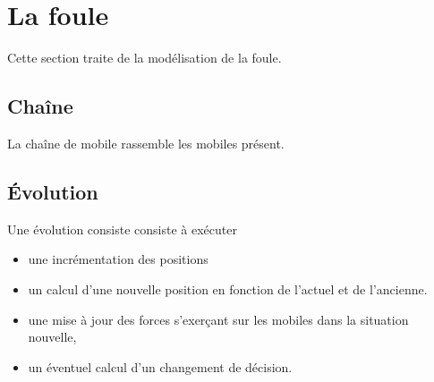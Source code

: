 %
\section{La foule}
%
Cette section traite de la modélisation de la foule.
%
\subsection{Chaîne}
La chaîne de mobile rassemble les mobiles présent.
%
\subsection{Évolution}
Une évolution consiste consiste à exécuter
\begin{itemize}[leftmargin=1cm, label=, itemsep=0pt]%
\item  une incrémentation des positions
\item  un calcul d'une nouvelle position en fonction de l'actuel et de l'ancienne.
\item  une mise à jour des forces s'exerçant sur les mobiles dans la situation nouvelle,
\item  un éventuel calcul d'un changement de décision.
\end{itemize}
%
